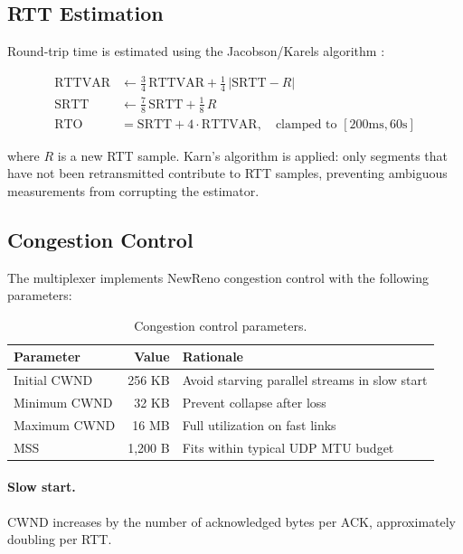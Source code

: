 \documentclass[11pt,a4paper]{article}
\let\oldparagraph\paragraph
\renewcommand{\paragraph}[1]{\needspace{5\baselineskip}\oldparagraph{#1}}
\begin{document}
\subsection{RTT Estimation}\label{sec:rtt}

Round-trip time is estimated using the Jacobson/Karels algorithm \cite{jacobson1988congestion}:

\begin{align}
  \text{RTTVAR} &\leftarrow \tfrac{3}{4}\,\text{RTTVAR} + \tfrac{1}{4}\,|\text{SRTT} - R| \\
  \text{SRTT} &\leftarrow \tfrac{7}{8}\,\text{SRTT} + \tfrac{1}{8}\,R \\
  \text{RTO} &= \text{SRTT} + 4 \cdot \text{RTTVAR}, \quad \text{clamped to } [200\text{ms}, 60\text{s}]
\end{align}

where $R$ is a new RTT sample. Karn's algorithm is applied: only segments that have not been retransmitted contribute to RTT samples, preventing ambiguous measurements from corrupting the estimator.

\subsection{Congestion Control}\label{sec:congestion}

The multiplexer implements NewReno congestion control \cite{rfc6582} with the following parameters:

\begin{table}[htbp]
\centering
\caption{Congestion control parameters.}
\label{tab:congestion}
\begin{tabular}{@{}lrl@{}}
\toprule
\textbf{Parameter} & \textbf{Value} & \textbf{Rationale} \\
\midrule
Initial CWND & 256 KB & Avoid starving parallel streams in slow start \\
Minimum CWND & 32 KB & Prevent collapse after loss \\
Maximum CWND & 16 MB & Full utilization on fast links \\
MSS & 1,200 B & Fits within typical UDP MTU budget \\
\bottomrule
\end{tabular}
\end{table}

\paragraph{Slow start.} CWND increases by the number of acknowledged bytes per ACK, approximately doubling per RTT.
\end{document}
